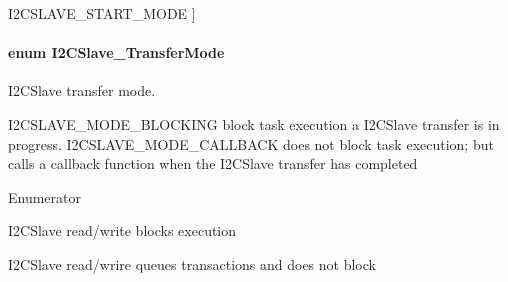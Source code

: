\begin{Desc}
\begin{description}
{I2\+C\+S\+L\+A\+V\+E\+\_\+\+S\+T\+A\+R\+T\+\_\+\+M\+O\+D\+E\label{_i2_c_slave_8h_a85d8ab819c05086d764dfd0a257b97caaa4f7f07c5cb10d98cc9dd08ffc40cf9a}
}]\item[{\em 
I2\+C\+S\+L\+A\+V\+E\+\_\+\+E\+R\+R\+O\+R\label{_i2_c_slave_8h_a85d8ab819c05086d764dfd0a257b97caa3f8c8244ead6629a301932793995b790}
}]\end{description}
\end{Desc}
\paragraph[{I2\+C\+Slave\+\_\+\+Transfer\+Mode}]{\setlength{\rightskip}{0pt plus 5cm}enum {\bf I2\+C\+Slave\+\_\+\+Transfer\+Mode}}\label{_i2_c_slave_8h_a5e27f9ba25088f9e7071e3e6f806559d}


I2\+C\+Slave transfer mode. 

I2\+C\+S\+L\+A\+V\+E\+\_\+\+M\+O\+D\+E\+\_\+\+B\+L\+O\+C\+K\+I\+N\+G block task execution a I2\+C\+Slave transfer is in progress. I2\+C\+S\+L\+A\+V\+E\+\_\+\+M\+O\+D\+E\+\_\+\+C\+A\+L\+L\+B\+A\+C\+K does not block task execution; but calls a callback function when the I2\+C\+Slave transfer has completed \begin{Desc}
\item[Enumerator]\par
\begin{description}
\item[{\em 
I2\+C\+S\+L\+A\+V\+E\+\_\+\+M\+O\+D\+E\+\_\+\+B\+L\+O\+C\+K\+I\+N\+G\label{_i2_c_slave_8h_a5e27f9ba25088f9e7071e3e6f806559dac85f5a1e6bca3d9402b2e5704387fa8f}
}]I2\+C\+Slave read/write blocks execution \item[{\em 
I2\+C\+S\+L\+A\+V\+E\+\_\+\+M\+O\+D\+E\+\_\+\+C\+A\+L\+L\+B\+A\+C\+K\label{_i2_c_slave_8h_a5e27f9ba25088f9e7071e3e6f806559da1dda6ae35d8aa92739d2714a4eaa4107}
}]I2\+C\+Slave read/wrire queues transactions and does not block \end{description}
\end{Desc}


